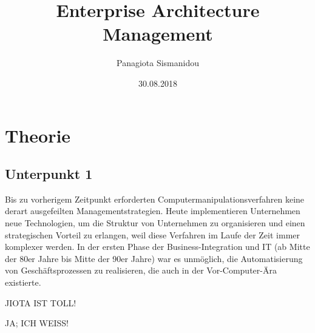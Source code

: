 \documentclass[
	A4paper,
	DIV=9,
	BCOR7mm,
	smallheadings,
	headinclude,
	footinclude,
	headsepline,
	parindent,
	german,
	captions=tableheading,
	abstracton
	]{scrreprt}
\title{Enterprise Architecture Management}
\author{Panagiota Sismanidou}
\date{30.08.2018}
\begin{document}
\maketitle

\tableofcontents

\chapter{Theorie}
\section{Unterpunkt 1}
Bis zu vorherigem Zeitpunkt erforderten Computermanipulationsverfahren keine derart ausgefeilten Managementstrategien. Heute implementieren Unternehmen neue Technologien, um die Struktur von Unternehmen zu organisieren und einen strategischen Vorteil zu erlangen, weil diese Verfahren im Laufe der Zeit immer komplexer werden.	
In der ersten Phase der Business-Integration und IT (ab Mitte der 80er Jahre bis Mitte der 90er Jahre) war es unmöglich, die Automatisierung von Geschäftsprozessen zu realisieren, die auch in der Vor-Computer-Ära existierte.

JIOTA IST TOLL!

JA; ICH WEISS!
\end{document}

